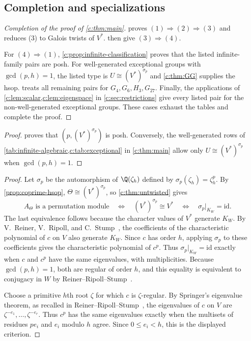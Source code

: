 \documentclass[11pt]{amsart}
\theoremstyle{definition}
\begin{document}
\subsection{Completion and specializations}\label{c:sec:completion}

\begin{proof}[Completion of the proof of \cref{c:thm:main}]
 proves $(1)\Rightarrow(2)\Rightarrow(3)$
and reduces (3) to Galois twists of $V^*$.
then give $(3)\Rightarrow(4)$.

For $(4)\Rightarrow(1)$, \cref{c:prop:infinite-classification}
proves that the listed infinite-family pairs are posh. For well-generated
exceptional groups with $\gcd(p,h)=1$, the listed type is
$U\cong(V^*)^{\sigma_p}$ and \cref{c:thm:GG} supplies the hsop.
 treats all remaining pairs for
$G_4,G_6,H_3,G_{27}$.
Finally, the applications of \cref{c:lem:scalar,c:lem:eigenspace}
in \cref{c:sec:restrictions} give every listed pair for the
non-well-generated exceptional groups. These cases exhaust the
tables and complete the proof.
\end{proof}

\coprimeproposition*
\begin{proof}
 proves that $(p,(V^*)^{\sigma_p})$ is posh. Conversely, the
well-generated rows of \cref{tab:infinite-algebraic,c:tab:exceptional}
in \cref{c:thm:main} allow only $U\cong(V^*)^{\sigma_p}$ when
$\gcd(p,h)=1$.
\end{proof}

\begingroup
\renewcommand{\footnote}[1]{}
\coxeterpermutationcorollary*
\endgroup
\begin{proof}
Let $\sigma_p$ be the automorphism of $\Q(\zeta_h)$ defined by
$\sigma_p(\zeta_h)=\zeta_h^p$. By \cref{prop:coprime-hsop},
$\Theta\cong(V^*)^{\sigma_p}$, so \cref{c:thm:untwisted} gives
\[
 A_\Theta\text{ is a permutation module}
 \quad\Longleftrightarrow\quad
 (V^*)^{\sigma_p}\cong V^*
 \quad\Longleftrightarrow\quad
 \sigma_p|_{K_W}=\mathrm{id}.
\]
The last equivalence follows because the character values of $V^*$
generate $K_W$. By V.~Reiner, V.~Ripoll, and C.~Stump~\cite[Theorem~1.8(iv)]{RRS},
the coefficients of the characteristic polynomial of $c$ on $V$
also generate $K_W$. Since $c$ has order $h$, applying $\sigma_p$
to these coefficients gives the characteristic polynomial of $c^p$.
Thus $\sigma_p|_{K_W}=\mathrm{id}$ exactly when $c$ and $c^p$ have
the same eigenvalues, with multiplicities. Because $\gcd(p,h)=1$,
both are regular of order $h$, and this equality is equivalent to
conjugacy in $W$ by Reiner--Ripoll--Stump~\cite[Lemma~3.4 and its proof]{RRS}.

Choose a primitive $h$th root $\zeta$ for which $c$ is $\zeta$-regular.
By Springer's eigenvalue theorem, as recalled in
Reiner--Ripoll--Stump~\cite[Theorem~2.4(ii)]{RRS}, the eigenvalues of
$c$ on $V$ are $\zeta^{-e_1},\ldots,\zeta^{-e_r}$. Thus $c^p$ has the
same eigenvalues exactly when the multisets of residues $p e_i$ and
$e_i$ modulo $h$ agree. Since $0\leq e_i<h$, this is the displayed
criterion.
\end{proof}
\end{document}
